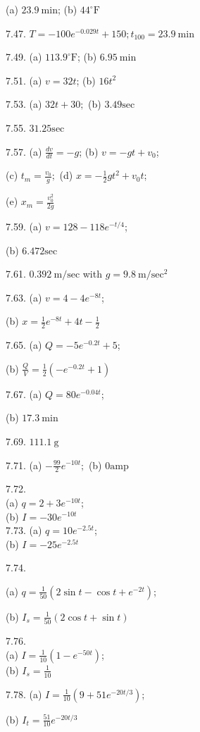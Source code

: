 \documentclass[10pt]{article}
\begin{document}
(a) $23.9 \mathrm{~min}$; (b) $44^{\circ} \mathrm{F}$

7.47. $T=-100 e^{-0.029 t}+150 ; t_{100}=23.9 \mathrm{~min}$

7.49. (a) $113.9^{\circ} \mathrm{F}$; (b) $6.95 \mathrm{~min}$

7.51. (a) $v=32 t$; (b) $16 t^{2}$

7.53. (a) $32 t+30 ;$ (b) $3.49 \mathrm{sec}$

7.55. $31.25 \mathrm{sec}$

7.57. (a) $\frac{d v}{d t}=-g$; (b) $v=-g t+v_{0}$;

(c) $t_{m}=\frac{v_{0}}{g} ;$ (d) $x=-\frac{1}{2} g t^{2}+v_{0} t$;

(e) $x_{m}=\frac{v_{0}^{2}}{2 g}$

7.59. (a) $v=128-118 e^{-t / 4}$;

(b) $6.472 \mathrm{sec}$

7.61. $0.392 \mathrm{~m} / \mathrm{sec}$ with $g=9.8 \mathrm{~m} / \mathrm{sec}^{2}$

7.63. (a) $v=4-4 e^{-8 t}$;

(b) $x=\frac{1}{2} e^{-8 t}+4 t-\frac{1}{2}$

7.65. (a) $Q=-5 e^{-0.2 t}+5$;

(b) $\frac{Q}{V}=\frac{1}{2}\left(-e^{-0.2 t}+1\right)$

7.67. (a) $Q=80 e^{-0.04 t}$;

(b) $17.3 \mathrm{~min}$

7.69. $111.1 \mathrm{~g}$

7.71. (a) $-\frac{99}{2} e^{-10 t} ;$ (b) $0 \mathrm{amp}$

7.72.\\
(a) $q=2+3 e^{-10 t}$;\\
(b) $I=-30 e^{-10 t}$\\
7.73. (a) $q=10 e^{-2.5 t}$;\\
(b) $I=-25 e^{-2.5 t}$

7.74.

(a) $q=\frac{1}{50}\left(2 \sin t-\cos t+e^{-2 t}\right)$;

(b) $I_{s}=\frac{1}{50}(2 \cos t+\sin t)$

7.76.\\
(a) $I=\frac{1}{10}\left(1-e^{-50 t}\right)$;\\
(b) $I_{s}=\frac{1}{10}$

7.78. (a) $I=\frac{1}{10}\left(9+51 e^{-20 t / 3}\right)$;

(b) $I_{t}=\frac{51}{10} e^{-20 t / 3}$
\end{document}
